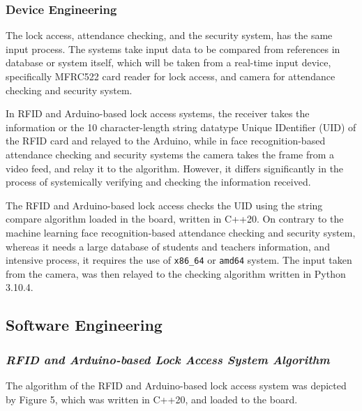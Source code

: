 \documentclass[12pt]{article}
\begin{document}
\subsubsection*{Device Engineering}

The lock access, attendance checking, and the security system, has the same input process. The systems take input data to be compared from references in database or system itself, which will be taken from a real-time input device, specifically MFRC522 card reader for lock access, and camera for attendance checking and security system.

In RFID and Arduino-based lock access systems, the receiver takes the information or the 10 character-length string datatype Unique IDentifier (UID) of the RFID card and relayed to the Arduino, while in face recognition-based attendance checking and security systems the camera takes the frame from a video feed, and relay it to the algorithm. However, it differs significantly in the process of systemically verifying and checking the information received.

The RFID and Arduino-based lock access checks the UID using the string compare algorithm loaded in the board, written in C++20. On contrary to the machine learning face recognition-based attendance checking and security system, whereas it needs a large database of students and teachers information, and intensive process, it requires the use of \texttt{x86\_64} or \texttt{amd64} system. The input taken from the camera, was then relayed to the checking algorithm written in Python 3.10.4.

\subsection*{Software Engineering}

\subsubsection*{\emph{RFID and Arduino-based Lock Access System Algorithm}}

The algorithm of the RFID and Arduino-based lock access system was depicted by Figure 5, which was written in C++20, and loaded to the board.
\end{document}

